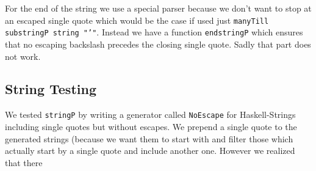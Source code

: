 \documentclass{article}
\begin{document}
For the end of the string we use a special parser because we don't want to stop at an
escaped single quote which would be the case if used just \texttt{manyTill substringP string "'"}.
Instead we have a function \texttt{endstringP} which ensures that no escaping backslash precedes the closing single quote.
Sadly that part does not work.

\subsection{String Testing}
We tested \texttt{stringP} by writing a generator called \texttt{NoEscape} for Haskell-Strings including single quotes but without escapes.
We prepend a single quote to the generated strings (because we want them to start with  and filter those which actually start by a single quote and include another one.
However we realized that there 
\end{document}

